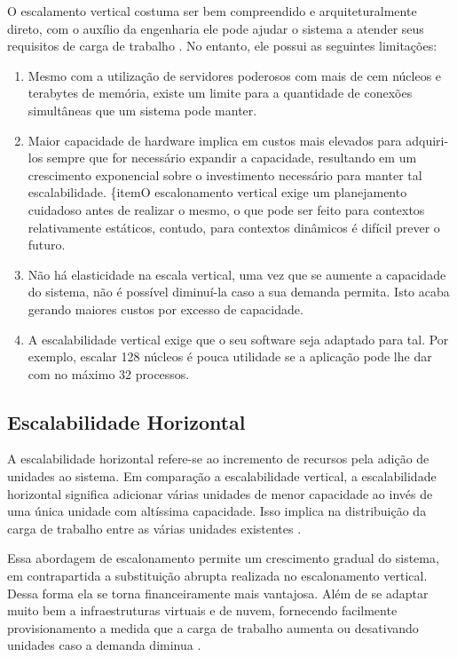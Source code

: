 O escalamento vertical costuma ser bem compreendido e arquiteturalmente direto,
com o auxílio da engenharia ele pode ajudar o sistema a atender seus requisitos
de carga de trabalho \cite{InterSystems2019}. No entanto, ele possui as seguintes
limitações:

\begin{enumerate}
    \item{Mesmo com a utilização de servidores poderosos com mais de cem núcleos
    e terabytes de memória, existe um limite para a quantidade de conexões
    simultâneas que um sistema pode manter.}
    \item{Maior capacidade de hardware implica em custos mais elevados para
    adquiri-los sempre que for necessário expandir a capacidade, resultando em
    um crescimento exponencial sobre o investimento necessário para manter tal
    escalabilidade.}
    \{item{O escalonamento vertical exige um planejamento cuidadoso antes de
    realizar o mesmo, o que pode ser feito para contextos relativamente estáticos,
    contudo, para contextos dinâmicos é difícil prever o futuro.}
    \item{Não há elasticidade na escala vertical, uma vez que se aumente a
    capacidade do sistema, não é possível diminuí-la caso a sua demanda permita.
    Isto acaba gerando maiores custos por excesso de capacidade.}
    \item{A escalabilidade vertical exige que o seu software seja adaptado para
    tal. Por exemplo, escalar 128 núcleos é pouca utilidade se a aplicação pode
    lhe dar com no máximo 32 processos.}
\end{enumerate}

\subsection{Escalabilidade Horizontal}

A escalabilidade horizontal refere-se ao incremento de recursos pela adição
de unidades ao sistema. Em comparação a escalabilidade vertical, a escalabilidade
horizontal significa adicionar várias unidades de menor capacidade ao invés de
uma única unidade com altíssima capacidade. Isso implica na distribuição da carga
de trabalho entre as várias unidades existentes \cite{FreshGuide2012}.

Essa abordagem de escalonamento permite um crescimento gradual do sistema, em
contrapartida a substituição abrupta realizada no escalonamento vertical. Dessa
forma ela se torna financeiramente mais vantajosa. Além de se adaptar muito bem
a infraestruturas virtuais e de nuvem, fornecendo facilmente provisionamento
a medida que a carga de trabalho aumenta ou desativando unidades caso a demanda
diminua \cite{InterSystems2019}.

